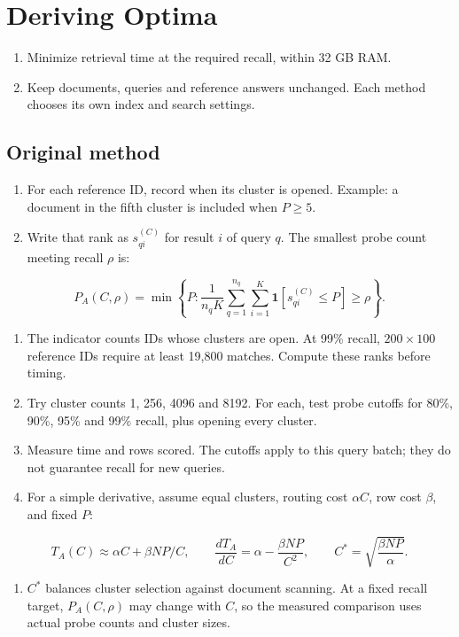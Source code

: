 \newpage
\section{Deriving Optima}
\begin{enumerate}
\item Minimize retrieval time at the required recall, within 32 GB RAM.
\item Keep documents, queries and reference answers unchanged. Each method chooses its own index and search settings.
\end{enumerate}

\subsection{Original method}
\begin{enumerate}
\item For each reference ID, record when its cluster is opened. Example: a document in the fifth cluster is included when $P\ge5$.
\item Write that rank as $s_{qi}^{(C)}$ for result $i$ of query $q$. The smallest probe count meeting recall $\rho$ is:
\end{enumerate}

\[
 P_A(C,\rho)=\min\left\{P:
 \frac{1}{n_qK}\sum_{q=1}^{n_q}\sum_{i=1}^{K}
 \mathbf 1[s_{qi}^{(C)}\le P]\ge\rho\right\}.
\]
\begin{enumerate}[start=3]
\item The indicator counts IDs whose clusters are open. At 99\% recall, $200\times100$ reference IDs require at least 19,800 matches. Compute these ranks before timing.
\item Try cluster counts 1, 256, 4096 and 8192. For each, test probe cutoffs for 80\%, 90\%, 95\% and 99\% recall, plus opening every cluster.
\item Measure time and rows scored. The cutoffs apply to this query batch; they do not guarantee recall for new queries.
\item For a simple derivative, assume equal clusters, routing cost $\alpha C$, row cost $\beta$, and fixed $P$:
\end{enumerate}

\[
 T_A(C)\approx\alpha C+\beta NP/C,\qquad
 \frac{dT_A}{dC}=\alpha-\frac{\beta NP}{C^2},\qquad
 C^*=\sqrt{\frac{\beta NP}{\alpha}}.
\]
\begin{enumerate}[start=7]
\item $C^*$ balances cluster selection against document scanning. At a fixed recall target, $P_A(C,\rho)$ may change with $C$, so the measured comparison uses actual probe counts and cluster sizes.
\end{enumerate}

